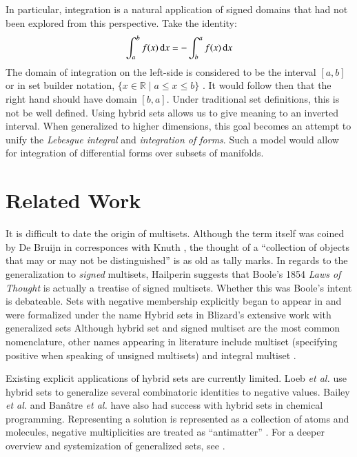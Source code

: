 In particular, integration is a natural application of signed domains that had not been explored from this perspective.
Take the identity:
\begin{equation}
	\int_a^b f(x) \mathop{}\!\mathrm{d} x = -\int_b^a f(x) \mathop{}\!\mathrm{d} x
\end{equation}
The domain of integration on the left-side is considered to be the interval $[a,b]$ or in set builder notation, 
$\{ x \in \mathbb{R} \; | \; a \leq x \leq b \}$ .
It would follow then that the right hand should have domain $[b,a]$.
Under traditional set definitions, this is not be well defined.
Using hybrid sets allows us to give meaning to an inverted interval.
When generalized to higher dimensions, this goal becomes an attempt to unify the \emph{Lebesgue integral} and \emph{integration of forms}.
Such a model would allow for integration of differential forms over subsets of manifolds.





\section{Related Work}


It is difficult to date the origin of multisets.
Although the term itself was coined by De Bruijn in corresponces with Knuth \cite{knuth2014art},
the thought of a ``collection of objects that may or may not be distinguished'' is as old as tally marks. 
In regards to the generalization to \emph{signed} multisets, Hailperin \cite{hailperin1986boole} 
suggests that Boole's 1854 \emph{Laws of Thought} \cite{boole1854investigation} is actually a treatise of signed multisets.
Whether this was Boole's intent is debateable.
Sets with negative membership explicitly began to appear in \cite{whitney1933characteristic} and were 
formalized under the name Hybrid sets in Blizard's extensive work with generalized sets \cite{blizard1988, blizard1990} 
Although hybrid set and signed multiset are the most common nomenclature, other names appearing in literature include
multiset (specifying positive when speaking of unsigned multisets) \cite{reisig1985petri} 
and integral multiset \cite{wildberger2003new}. 


Existing explicit applications of hybrid sets are currently limited.
Loeb \emph{et al.} \cite{damiani1991, loeb1992} use hybrid sets to generalize several combinatoric identities to negative values.
Bailey \emph{et al.} \cite{bailey2009hypergraphic} and Ban\^{a}tre \emph{et al.} \cite{banatre2006} 
have also had success with hybrid sets in chemical programming. 
Representing a solution is represented as a collection of atoms and molecules, 
negative multiplicities are treated as ``antimatter'' . 
For a deeper overview and systemization of generalized sets, see \cite{singh2007, singh2008systematization}.





